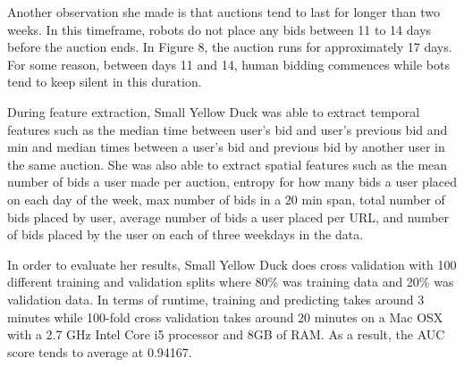\documentclass{article} %
\begin{document}
Another observation she made is that auctions tend to last for longer than two weeks.
In this timeframe, robots do not place any bids between 11 to 14 days before the auction ends.
In Figure 8, the auction runs for approximately 17 days. %
For some reason, between days 11 and 14, human bidding commences while bots tend to keep silent in this duration.

\begin{figure}[h]
\centering
{}
\end{figure}

During feature extraction, Small Yellow Duck was able to extract temporal features such as the median time between user's bid and user's previous bid and min and median times between a user's bid and previous bid by another user in the same auction. She was also able to extract spatial features such as the mean number of bids a user made per auction, entropy for how many bids a user placed on each day of the week, max number of bids in a 20 min span, total number of bids placed by user, average number of bids a user placed per URL, and number of bids placed by the user on each of three weekdays in the data.

In order to evaluate her results, Small Yellow Duck does cross validation with 100 different training and validation splits where 80\% was training data and 20\% was validation data.
In terms of runtime, training and predicting takes around 3 minutes while 100-fold cross validation takes around 20 minutes on a Mac OSX with a 2.7 GHz Intel Core i5 processor and 8GB of RAM.
As a result, the AUC score tends to average at 0.94167. 
\end{document}
